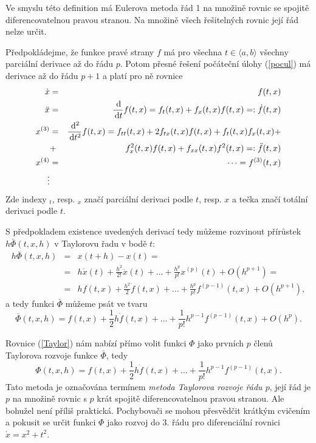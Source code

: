 \documentclass[a4paper, 12pt]{book}
\theoremstyle{definition}
\def\d{\,{\rm d}}               %
\begin{document}
Ve smyslu této definition má Eulerova metoda řád 1 na množině rovnic se spojitě 
diferencovatelnou pravou stranou. Na množině všech řešitelných rovnic její
řád nelze určit.

Předpokládejme, že funkce pravé strany $f$ má pro všechna $t\in\langle a,b\rangle$
všechny parciální derivace až do řádu $p$. Potom přesné řešení počáteční úlohy 
(\ref{pocul}) má derivace až do řádu $p+1$ a platí pro ně rovnice
\begin{eqnarray*}
\dot x &=& f(t,x)\\
\ddot x &=& \frac{\d}{\d t} f(t,x)=f_t(t,x) + f_x(t,x) f(t,x) =: \dot f(t,x)\\
x^{(3)} &=& \frac{\d^2}{\d t^2} f(t,x)=f_{tt}(t,x)+2 f_{tx}(t,x)f(t,x) + f_t(t,x)f_x(t,x) + \\ %
&+&f_x^2(t,x)f(t,x) + f_{xx}(t,x)f^2(t,x) =: \ddot f(t,x)\\
x^{(4)} &=& \dots = f^{(3)}(t,x)\\
\vdots &&
\end{eqnarray*}
Zde indexy $_t$, resp. $_x$ značí parciální derivaci podle $t$, resp. $x$ a tečka 
značí totální derivaci podle $t$.

S předpokladem existence uvedených derivací tedy můžeme rozvinout přírůstek
$h\bar\Phi(t,x,h)$ v Taylorovu řadu v bodě $t$:
\begin{eqnarray*}
h\bar\Phi(t,x,h) &=& x(t+h) - x(t) = \\
&=&h\dot x(t) + \frac{h^2}{2!}\ddot x(t)+\dots+\frac{h^p}{p!}x^{(p)}(t)+O(h^{p+1})=\\
&=&hf(t,x)+ \frac{h^2}{2}\dot f(t,x)+\dots+\frac{h^p}{p!}f^{(p-1)}(t,x)+O(h^{p+1}),
\end{eqnarray*}
a tedy funkci $\bar\Phi$ můžeme psát ve tvaru
\begin{equation}\label{Taylor}
\bar\Phi(t,x,h) = f(t,x)+ \frac{1}{2}h\dot f(t,x)+\dots+\frac{1}{p!}h^{p-1}f^{(p-1)}(t,x)+O(h^{p}).
\end{equation}

Rovnice (\ref{Taylor}) nám nabízí přímo volit funkci $\Phi$ jako prvních $p$ členů
Taylorova rozvoje funkce $\bar\Phi$, tedy
\begin{displaymath}
\Phi(t,x,h) = f(t,x)+ \frac{1}{2}h\dot f(t,x)+\dots+\frac{1}{p!}h^{p-1}f^{(p-1)}(t,x).
\end{displaymath}
Tato metoda je označována termínem {\em metoda Taylorova rozvoje řádu $p$}, její řád
je $p$ na množině rovnic s $p$ krát spojitě diferencovatelnou pravou stranou. Ale
bohužel není příliš praktická. Pochybovači se mohou přesvědčit krátkým cvičením a 
pokusit se určit funkci $\Phi$ jako rozvoj do 3. řádu pro diferenciální rovnici 
$\dot x=x^2 + t^2$.
\end{document}
